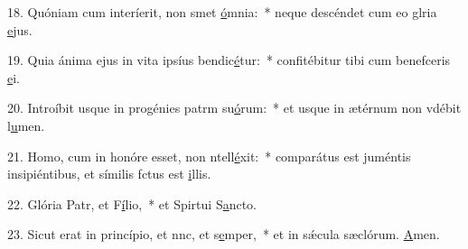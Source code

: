 18. Quóniam cum interíerit, non smet \uline{ó}mnia:~* neque descéndet cum eo glria \uline{e}jus.\par 
19. Quia ánima ejus in vita ipsíus bendic\uline{é}tur:~* confitébitur tibi cum benefceris \uline{e}i.\par 
20. Introíbit usque in progénies patrm su\uline{ó}rum:~* et usque in ætérnum non vdébit l\uline{u}men.\par 
21. Homo, cum in honóre esset, non ntell\uline{é}xit:~* comparátus est juméntis insipiéntibus, et símilis fctus est \uline{i}llis.\par 
22. Glória Patr, et F\uline{í}lio,~* et Spirtui S\uline{a}ncto.\par 
23. Sicut erat in princípio, et nnc, et s\uline{e}mper,~* et in sǽcula sæclórum. \uline{A}men.\par 
